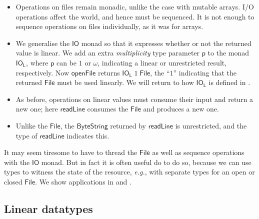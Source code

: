 \documentclass[acmsmall,screen]{acmart}\settopmatter{}
\newcommand{\Conid}[1]{\mathit{#1}}
\newcommand{\Varid}[1]{\mathit{#1}}
\renewcommand\Varid[1]{\mathord{\textsf{#1}}}
\renewcommand\Conid[1]{\mathord{\textsf{#1}}}
\newcommand{\eg}{\textit{e.g.}\xspace}
\newcommand{\varid}[1]{\ensuremath{\Varid{#1}}}
\begin{document}
\begin{itemize}

\item Operations on files remain monadic, unlike the case with mutable arrays.
I/O operations affect the world, and hence must be sequenced.  It is not enough
to sequence operations on files individually, as it was for arrays.

\item We generalise the \ensuremath{\Conid{IO}} monad so that it expresses whether or not the
returned value is linear.  We add an extra {\em multiplicity} type parameter \ensuremath{\Varid{p}} to the monad \ensuremath{\varid{IO}_{\varid{L}}},
where \ensuremath{\Varid{p}} can be \ensuremath{\mathrm{1}} or \ensuremath{\omega}, indicating a linear or unrestricted result, respectively.
%
Now \ensuremath{\Varid{openFile}} returns \ensuremath{\varid{IO}_{\varid{L}}\;\mathrm{1}\;\Conid{File}},
the ``\ensuremath{\mathrm{1}}'' indicating that the returned \ensuremath{\Conid{File}} must be used linearly.
We will return to how \ensuremath{\varid{IO}_{\varid{L}}} is defined in .

\item As before, operations on linear values must consume their input
and return a new one; here \ensuremath{\Varid{readLine}} consumes the \ensuremath{\Conid{File}} and produces a new one.

\item Unlike the \ensuremath{\Conid{File}}, the \ensuremath{\Conid{ByteString}} returned by \ensuremath{\Varid{readLine}} is unrestricted,
and the type of \ensuremath{\Varid{readLine}} indicates this.

\end{itemize}
It may seem tiresome to have to thread the \ensuremath{\Conid{File}} as well as sequence
operations with the \ensuremath{\Conid{IO}} monad. But in fact it is often useful do
to do so, because we can use types
to witness the state of the resource, \eg, with separate
types for an open or closed \ensuremath{\Conid{File}}. We show applications in  and .

\subsection{Linear datatypes}
\label{sec:linear-constructors}
\label{sec:datatypes}
\end{document}
